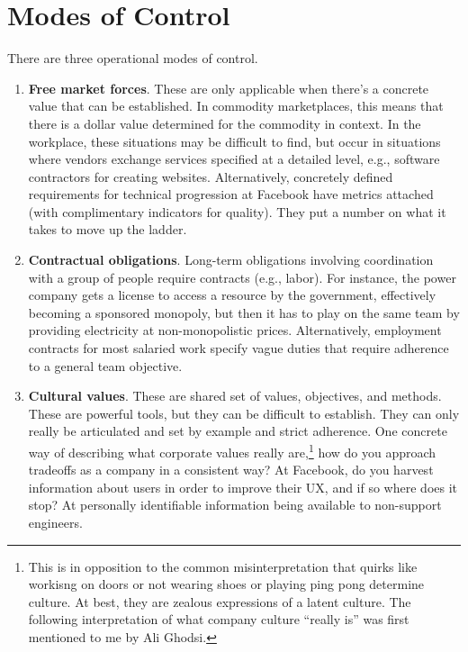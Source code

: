 \documentclass{article}
\begin{document}
\section{Modes of Control}

There are three operational modes of control.

\begin{enumerate}
\item \textbf{Free market forces}. These are only applicable when there's a concrete value that can be established. In commodity marketplaces, this means that there is a dollar value determined for the commodity in context. In the workplace, these situations may be difficult to find, but occur in situations where vendors exchange services specified at a detailed level, e.g., software contractors for creating websites. Alternatively, concretely defined requirements for technical progression at Facebook have metrics attached (with complimentary indicators for quality). They put a number on what it takes to move up the ladder.
\item \textbf{Contractual obligations}. Long-term obligations involving coordination with a group of people require contracts (e.g., labor). For instance, the power company gets a license to access a resource by the government, effectively becoming a sponsored monopoly, but then it has to play on the same team by providing electricity at non-monopolistic prices. Alternatively, employment contracts for most salaried work specify vague duties that require adherence to a general team objective.
\item \textbf{Cultural values}. These are shared set of values, objectives, and methods. These are powerful tools, but they can be difficult to establish. They can only really be articulated and set by example and strict adherence. One concrete way of describing what corporate values really are,\footnote{This is in opposition to the common misinterpretation that quirks like workisng on doors or not wearing shoes or playing ping pong determine culture. At best, they are zealous expressions of a latent culture. The following interpretation of what company culture ``really is'' was first mentioned to me by Ali Ghodsi.} how do you approach tradeoffs as a company in a consistent way? At Facebook, do you harvest information about users in order to improve their UX, and if so where does it stop? At personally identifiable information being available to non-support engineers.
\end{enumerate}
\end{document}
